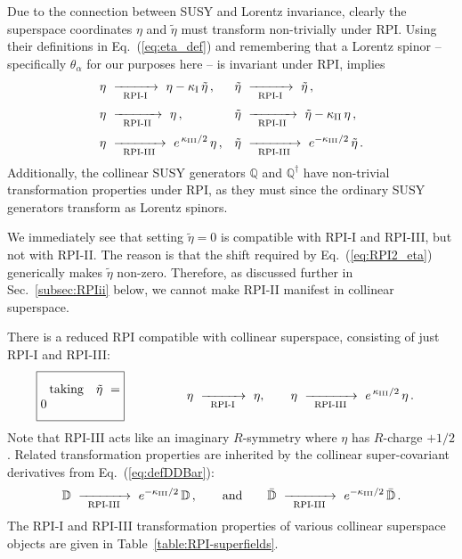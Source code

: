 \documentclass[12pt,document,nofootinbib,superscriptaddress,onecolumn,preprintnumbers,balancelastpage]{article}
\newcommand{\RPIi}{\,\,\xrightarrow[\hspace{5pt}\text{RPI-I}\hspace{5pt}]{}\,\,}
\newcommand{\RPIii}{\,\,\xrightarrow[\hspace{5pt}\text{RPI-II}\hspace{5pt}]{}\,\,}
\newcommand{\RPIiii}{\,\,\xrightarrow[\hspace{5pt}\text{RPI-III}\hspace{5pt}]{}\,\,}
\DeclareRobustCommand{\Sec}[1]{Sec.~\ref{#1}}
\DeclareRobustCommand{\Tab}[1]{Table~\ref{#1}}
\DeclareRobustCommand{\Eq}[1]{Eq.~(\ref{#1})}
\newcommand{\D}{\mathbb{D}}
\newcommand{\Q}{\mathbb{Q}}
\begin{document}
\begin{spacing}{1.2}
Due to the connection between SUSY and Lorentz invariance, clearly the superspace coordinates $\eta$ and $\tilde{\eta}$ must transform non-trivially under RPI.
%
Using their definitions in \Eq{eq:eta_def} and remembering that a Lorentz spinor -- specifically $\theta_\alpha$ for our purposes here -- is invariant under RPI, implies
\begin{align}
\eta &\RPIi \eta - \kappa_{\rm I} \,  \tilde{\eta} \,, &  \tilde{\eta} &\RPIi \tilde{\eta} \,, \\[2pt]
\eta &\RPIii \eta\,, &  \tilde{\eta} &\RPIii \tilde{\eta}- \kappa_{\rm II} \, \eta\,, \label{eq:RPI2_eta}\\[2pt]
\eta &\RPIiii e^{\,\kappa_{\rm III}/2}\, \eta\,,&  \tilde{\eta} &\RPIiii e^{-\kappa_{\rm III}/2} \, \tilde{\eta}  \,.
\end{align}
%
Additionally, the collinear SUSY generators $\Q$ and $\Q^\dagger$ have non-trivial transformation properties under RPI, as they must since the ordinary SUSY generators transform as Lorentz spinors. 


We immediately see that setting $\tilde{\eta} = 0$ is compatible with RPI-I and RPI-III, but not with RPI-II.
%
The reason is that the shift required by \Eq{eq:RPI2_eta} generically makes $\tilde{\eta}$ non-zero.
%
Therefore, as discussed further in \Sec{subsec:RPIii} below, we cannot make RPI-II manifest in collinear superspace.

There is a reduced RPI compatible with collinear superspace, consisting of just RPI-I and RPI-III: 
%
\begin{align}
\Aboxed{\begin{minipage}{0.185\linewidth}\vspace{7pt}$\hspace{7pt}\text{taking}\quad\tilde{\eta} = 0$\vspace{7pt}\end{minipage}} \hspace{50pt}  \eta  \RPIi \eta, \qquad   \eta \RPIiii e^{\,\kappa_{\rm III}/2} \, \eta\,.
\end{align}
%
Note that RPI-III acts like an imaginary $R$-symmetry where $\eta$ has $R$-charge $+1/2$.
%
Related transformation properties are inherited by the collinear super-covariant derivatives from \Eq{eq:defDDBar}:
%
\begin{align}
\D \RPIiii e^{-\kappa_{\rm III}/2} \,\D\,, \qquad \text{and} \qquad \bar{\D} \RPIiii e^{-\kappa_{\rm III}/2}\, \bar{\D}\,.
\end{align}
%
The RPI-I and RPI-III transformation properties of various collinear superspace objects are given in \Tab{table:RPI-superfields}.



\end{spacing}
\end{document}
